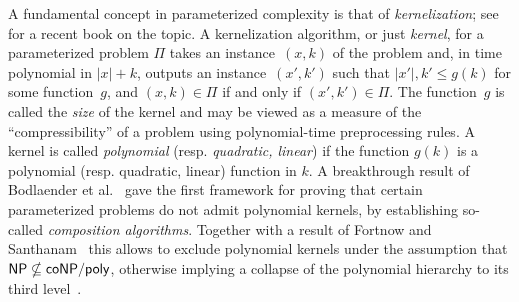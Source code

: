 A fundamental concept in parameterized complexity is that of \emph{kernelization}; see~\cite{book-kernels} for a recent book on the topic. A kernelization
algorithm, or just \emph{kernel}, for a parameterized problem $\Pi $ takes an
instance~$(x,k)$ of the problem and, in time polynomial in $|x| + k$, outputs
an instance~$(x',k')$ such that $|x'|, k' \leqslant g(k)$ for some
function~$g$, and $(x,k) \in \Pi$ if and only if $(x',k') \in \Pi$. The function~$g$ is called the \emph{size} of the kernel and may
be viewed as a measure of the ``compressibility'' of a problem using
polynomial-time preprocessing rules. A kernel is called \emph{polynomial} (resp. \emph{quadratic, linear}) if the function $g(k)$ is a polynomial (resp. quadratic, linear) function in $k$.
A breakthrough result of Bodlaender et al.~\cite{BodlaenderDFH09} gave the first framework for proving that certain parameterized problems
do not admit polynomial kernels, by establishing so-called \emph{composition algorithms}. Together with a result of Fortnow and
Santhanam~\cite{FortnowS11} this allows to exclude polynomial kernels under the assumption that ${\sf NP} \nsubseteq {\sf coNP} / {\sf poly}$, otherwise implying
a collapse of the polynomial hierarchy to its third level~\cite{Yap83}. 